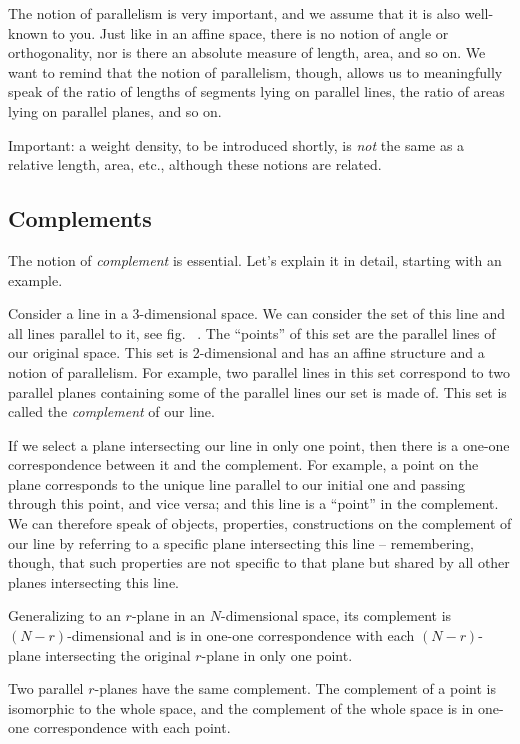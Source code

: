 \documentclass[\ifafour a4paper,12pt,\else a5paper,10pt,\fi%
onecolumn,oneside,article,%
british%
]{memoir}
\theoremstyle{remark}
\theoremstyle{innote}
\renewcommand*{\|}{\nonscript\,\vert\nonscript\;\mathopen{}}
\newcommand*{\fig}{fig.}%
\newcommand*{\etc}{{etc.}}
\newcommand*{\puzzle}{{\fontencoding{U}\fontfamily{fontawesometwo}\selectfont\symbol{225}}}
\newcommand{\mynote}[1]{ {\color{notecolour}\puzzle\ #1}}
\newcommand*{\+}{\boxplus}
\newcommand*{\yr}{r}
\newcommand*{\yN}{N}
\begin{document}
The notion of parallelism is very important, and we assume that it is also
well-known to you. Just like in an affine space, there is no notion of
angle or orthogonality, nor is there an absolute measure of length, area,
and so on. We want to remind that the notion of parallelism, though, allows
us to meaningfully speak of the ratio of lengths of segments lying on
parallel lines, the ratio of areas lying on parallel planes, and so on.

Important: a weight density, to be introduced shortly, is \emph{not} the
same as a relative length, area, \etc, although these notions are related.

\subsection{Complements}
\label{sec:complements}

The notion of \emph{complement} is essential. Let's explain it in detail,
starting with an example.

Consider a line in a 3-dimensional space. We can consider the set of this
line and all lines parallel to it, see \fig\mynote{}. The \enquote{points} of
this set are the parallel lines of our original space. This set is
2-dimensional and has an affine structure and a notion of parallelism. For
example, two parallel lines in this set correspond to two parallel planes
containing some of the parallel lines our set is made of. This set is
called the \emph{complement} of our line.

If we select a plane intersecting our line in only one point, then there is
a one-one correspondence between it and the complement. For example, a
point on the plane corresponds to the unique line parallel to our initial
one and passing through this point, and vice versa; and this line is a
\enquote{point} in the complement. We can therefore speak of objects,
properties, constructions on the complement of our line by referring to a
specific plane intersecting this line -- remembering, though, that such
properties are not specific to that plane but shared by all other planes
intersecting this line.

Generalizing to an $\yr$-plane in an $\yN$-dimensional space, its
complement is $(\yN-\yr)$-dimensional and is in one-one correspondence with
each $(\yN-\yr)$-plane intersecting the original $\yr$-plane in only one
point.

Two parallel $\yr$-planes have the same complement. The complement of a
point is isomorphic to the whole space, and the complement of the whole
space is in one-one correspondence with each point.
\end{document}
